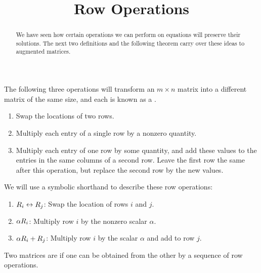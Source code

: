 \documentclass{ximera}
\title{Row Operations}
\begin{document}
\begin{abstract}
  We have seen how certain operations we can perform on equations will
  preserve their solutions.  The next two definitions and the
  following theorem carry over these ideas to augmented matrices.
\end{abstract}
\maketitle


\begin{definition}
The following three operations will transform an $m\times n$ matrix into a different matrix of the same size, and each is known as a .
\begin{enumerate}
\item Swap the locations of two rows.
\item Multiply each entry of a single row by a nonzero quantity.
\item Multiply each entry of one row by some quantity, and add these values to the entries in the same columns of a second row.  Leave the first row the same after this operation, but replace the second row by the new values.
\end{enumerate}
We will use a symbolic shorthand to describe these row operations:
\begin{enumerate}
\item $R_{i}\leftrightarrow R_{j}$: Swap the location of rows $i$ and $j$.
\item $\alpha R_{i}$: Multiply row $i$ by the nonzero scalar $\alpha$.
\item $\alpha R_{i}+R_{j}$: Multiply row $i$ by the scalar $\alpha$ and add to row $j$.
\end{enumerate}
\end{definition}

\begin{definition}
Two matrices are  if one can be obtained from the other by a sequence of row operations.
\end{definition}
\end{document}
